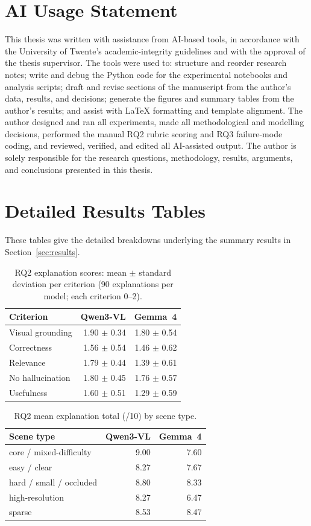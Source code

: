 \documentclass[acmtog, authorversion]{acmart}
\begin{document}
\section{AI Usage Statement}
\label{app:ai}
This thesis was written with assistance from AI-based tools, in
accordance with the University of Twente's academic-integrity
guidelines and with the approval of the thesis supervisor. The tools
were used to: structure and reorder research notes; write and debug the
Python code for the experimental notebooks and analysis scripts; draft
and revise sections of the manuscript from the author's data, results,
and decisions; generate the figures and summary tables from the
author's results; and assist with LaTeX formatting and template
alignment. The author designed and ran all experiments, made all
methodological and modelling decisions, performed the manual RQ2 rubric
scoring and RQ3 failure-mode coding, and reviewed, verified, and edited
all AI-assisted output. The author is solely responsible for the
research questions, methodology, results, arguments, and conclusions
presented in this thesis.

\section{Detailed Results Tables}
\label{app:tables}
These tables give the detailed breakdowns underlying the summary
results in Section~\ref{sec:results}.

\begin{table}[H]
\caption{RQ2 explanation scores: mean $\pm$ standard deviation per
  criterion (90 explanations per model; each criterion 0--2).}
\label{tab:rq2sd}
\begin{tabular}{lrr}
\toprule
Criterion & Qwen3-VL & Gemma~4 \\
\midrule
Visual grounding & 1.90 $\pm$ 0.34 & 1.80 $\pm$ 0.54 \\
Correctness & 1.56 $\pm$ 0.54 & 1.46 $\pm$ 0.62 \\
Relevance & 1.79 $\pm$ 0.44 & 1.39 $\pm$ 0.61 \\
No hallucination & 1.80 $\pm$ 0.45 & 1.76 $\pm$ 0.57 \\
Usefulness & 1.60 $\pm$ 0.51 & 1.29 $\pm$ 0.59 \\
\bottomrule
\end{tabular}
\end{table}

\begin{table}[H]
\caption{RQ2 mean explanation total (/10) by scene type.}
\label{tab:rq2group}
\begin{tabular}{lrr}
\toprule
Scene type & Qwen3-VL & Gemma~4 \\
\midrule
core / mixed-difficulty & 9.00 & 7.60 \\
easy / clear & 8.27 & 7.67 \\
hard / small / occluded & 8.80 & 8.33 \\
high-resolution & 8.27 & 6.47 \\
sparse & 8.53 & 8.47 \\
\bottomrule
\end{tabular}
\end{table}
\end{document}
